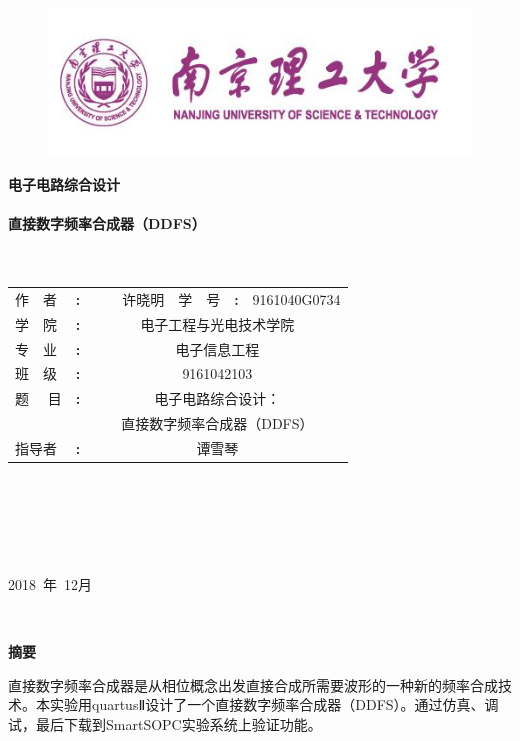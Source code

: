 \documentclass[12pt]{article}
\begin{document}
\begin{center}
\renewcommand\refname{参考文献}

\renewcommand\appendix{\setcounter{secnumdepth}{0}}
\begin{figure}[h]
\centering
  \includegraphics[width=.6\textwidth]{image001.png} 
\end{figure}
\thispagestyle{empty}
\songti{}\textbf{电子电路综合设计}\\ 
\ \\ \textbf{直接数字频率合成器（DDFS）}\\\ \\\ 
\renewcommand\arraystretch{1.5}
\begin{tabular}{p{1.7cm}p{0.2cm}p{3.5cm}p{1.7cm}p{0.2cm}p{3.5cm}}
作\ \  者&\textbf{:}&\ \ \ \ 许晓明&学\  \   号&\textbf{:}&9161040G0734\\\cline{3-3}\cline{6-6}
学\  \ 院&\textbf{:}&\multicolumn{4}{c}{电子工程与光电技术学院}\\\cline{3-6}
专\ \ 业&\textbf{:}&\multicolumn{4}{c}{电子信息工程}\\\cline{3-6}
班\ \ 级&\textbf{:}&\multicolumn{4}{c}{9161042103}\\\cline{3-6}
题 \ \ 目&\textbf{:}&\multicolumn{4}{c}{电子电路综合设计：}\\\cline{3-6}
&&\multicolumn{4}{c}{直接数字频率合成器（DDFS）}\\\cline{3-6}
指导者&\textbf{:}&\multicolumn{4}{c}{谭雪琴}\\\cline{3-6}
\end{tabular}\\
\ \\
\ \\
\ \\
\ \\
2018\ 年\ 12月
\end{center}
\newpage
\ 
\thispagestyle{empty}
\newpage
{}
\newpage
\thispagestyle{empty}
\begin{center}\textbf{摘要}\end{center}
\par
直接数字频率合成器是从相位概念出发直接合成所需要波形的一种新的频率合成技术。本实验用quartusⅡ设计了一个直接数字频率合成器（DDFS）。通过仿真、调试，最后下载到SmartSOPC实验系统上验证功能。\par
\end{document}

